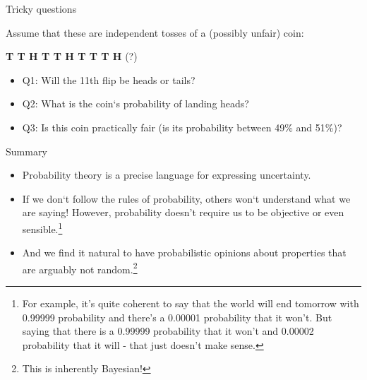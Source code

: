\begin{frame}{Tricky questions}

Assume that these are independent tosses of a (possibly unfair) coin:

\begin{center}
\textbf{T  T  H  T  T  H  T  T  T  H} {\color{red}(?)}
\end{center}

\begin{small}
\bigskip
\begin{itemize}
\item {\color{red} Q1:} Will the 11th flip be heads or tails?\pause
\item {\color{red} Q2:} What is the coin‘s probability of landing heads?\pause
\item {\color{red} Q3:} Is this coin practically fair (is its probability between 49\% and 51\%)?
\end{itemize}
\end{small}
\bigskip
\end{frame}


\begin{frame}{Summary}

\begin{itemize}
\item Probability theory is a precise language for expressing uncertainty.
\item If we don‘t follow the rules of probability, others won‘t understand what we are saying! However, probability doesn't require us to be objective or even sensible.\footnote{For example, it's quite coherent to say that the world will end tomorrow with 0.99999 probability and there's a 0.00001 probability that it won't. But saying that there is a 0.99999 probability that it won't and 0.00002 probability that it will - that just doesn't make sense.}
\item And we find it natural to have probabilistic opinions about properties that are arguably not random.\footnote{This is inherently Bayesian!}
\end{itemize}
\end{frame}


